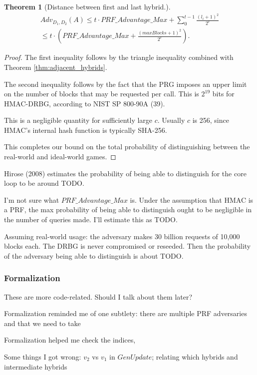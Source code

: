 \documentclass[12pt,lot, lof]{puthesis}
\newcommand{\f}{\frac}
\newtheorem{thm}{Theorem}
\begin{document}
\begin{thm}[Distance between first and last hybrid.] \label{thm:hybrids}
\begin{gather*}
Adv_{D_1, D_2}(A) \leq t \cdot PRF\_Advantage\_Max + \sum_{0}^{t-1} \f{(l_i+1)^2}{2^c} \\ 
\leq t \cdot (PRF\_Advantage\_Max + \f{(maxBlocks + 1)^2}{2^c}).
\end{gather*}
\end{thm}
\begin{proof}
The first inequality follows by the triangle inequality combined with Theorem \ref{thm:adjacent_hybrids}. 

The second inequality follows by the fact that the PRG imposes an upper limit on the number of blocks that may be requested per call. This is $2^{19}$ bits for HMAC-DRBG, according to NIST SP 800-90A (39).

This is a negligible quantity for sufficiently large $c$. Usually $c$ is 256, since HMAC's internal hash function is typically SHA-256.

This completes our bound on the total probability of distinguishing between the real-world and ideal-world games.
\end{proof}

Hirose (2008) estimates the probability of being able to distinguish for the core loop to be around TODO.

I'm not sure what $PRF\_Advantage\_Max$ is. Under the assumption that HMAC is a PRF, the max probability of being able to distinguish ought to be negligible in the number of queries made. I'll estimate this as TODO.

Assuming real-world usage: the adversary makes 30 billion requests of 10,000 blocks each. The DRBG is never compromised or reseeded. Then the probability of the adversary being able to distinguish is about TODO.

\subsubsection{Formalization}

These are more code-related. Should I talk about them later?

Formalization reminded me of one subtlety: there are multiple PRF adversaries and that we need to take 

Formalization helped me check the indices, 

Some things I got wrong: $v_2$ vs $v_1$ in $GenUpdate$; relating which hybrids and intermediate hybrids
\end{document}
